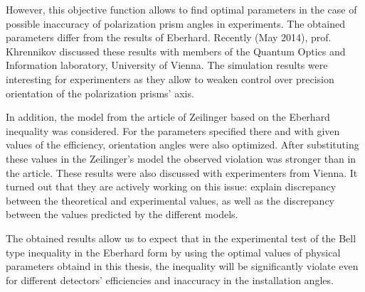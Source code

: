 \documentclass[%
master,         %
subf,           %
href,           %
colorlinks=true %
]{disser}
\numberwithin{equation}{section}
\numberwithin{figure}{section}
\begin{document}
However, this objective function allows to find optimal parameters in the case of possible inaccuracy of polarization prism angles in experiments. 
The obtained parameters differ from the results of Eberhard. Recently (May 2014), prof. Khrennikov discussed these results with members of the Quantum Optics and Information laboratory, University of Vienna. The simulation results were interesting for experimenters as they allow to weaken control over precision orientation of the polarization prisms' axis.

In addition, the model from the article of Zeilinger \cite{Zeilinger} based on the Eberhard inequality was considered. For the parameters specified there and with given values of the efficiency, orientation angles were also optimized. After substituting these values in the Zeilinger's model the observed violation was stronger than in the article. These results were also discussed with experimenters from Vienna. It turned out that they are actively working on this issue: explain discrepancy between the theoretical and experimental values, as well as the discrepancy between the values predicted by the different models. 

The obtained results allow us to expect that in the experimental test of the Bell type inequality in the Eberhard form by using the optimal values of physical parameters obtaind in this thesis, the inequality will be significantly violate even for different detectors' efficiencies and inaccuracy in the installation angles.


\end{document}
